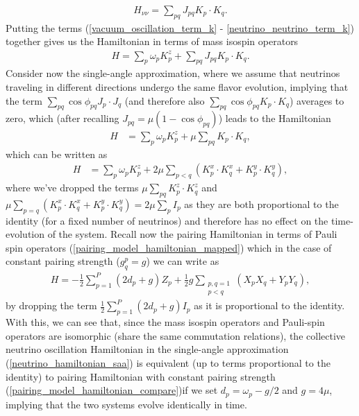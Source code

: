 \documentclass[Dual]{msu-thesis}
\begin{document}
\begin{align}
\label{neutrino_neutrino_term_k}
H_{\nu\nu}=\sum_{pq}J_{pq}K_p\cdot K_q
.\end{align}
Putting the terms (\ref{vacuum_oscillation_term_k} - \ref{neutrino_neutrino_term_k}) together gives us the Hamiltonian in terms of mass isospin operators
\begin{align}
H=\sum_p\omega_pK^z_p+\sum_{pq}J_{pq}K_p\cdot K_q
.\end{align}
Consider now the single-angle approximation, where we assume that neutrinos traveling in different directions undergo the same flavor evolution, implying that the term $\sum_{pq}\cos\phi_{pq}J_p\cdot J_q$ (and therefore also $\sum_{pq}\cos\phi_{pq}K_p\cdot K_q$) averages to zero, which (after recalling $J_{pq}=\mu(1-\cos\phi_{pq})$) leads to the Hamiltonian
\begin{align}
H
&=
\sum_p\omega_pK^z_p+\mu\sum_{pq}K_p\cdot K_q
,\end{align}
which can be written as
\begin{align}
\label{neutrino_hamiltonian_saa}
H
&=
\sum_p\omega_pK^z_p+2\mu\sum_{p<q}(K^x_p\cdot K^x_q+K^y_p\cdot K^y_q)
,\end{align}
where we've dropped the terms $\mu\sum_{pq}K^z_p\cdot K^z_q$ and $\mu\sum_{p=q}(K^x_p\cdot K^x_q+K^y_p\cdot K^y_q)=2\mu\sum_{p}I_p$ as they are both proportional to the identity (for a fixed number of neutrinos) and therefore has no effect on the time-evolution of the system. Recall now the pairing Hamiltonian in terms of Pauli spin operators (\ref{pairing_model_hamiltonian_mapped}) which in the case of constant pairing strength ($g^p_q=g$) we can write as 
\begin{align}
\label{pairing_model_hamiltonian_compare}
H
=
-\frac{1}{2}\sum_{p=1}^P(2d_p+g)Z_p
+
\frac{1}{2}g\sum_{\substack{p,q=1 \\ p<q}}(X_pX_q+Y_pY_q)
,\end{align}
by dropping the term $\frac{1}{2}\sum_{p=1}^P(2d_p+g)I_p$ as it is proportional to the identity. With this, we can see that, since the mass isospin operators and Pauli-spin operators are isomorphic (share the same commutation relations), the collective neutrino oscillation Hamiltonian in the single-angle approximation (\ref{neutrino_hamiltonian_saa}) is equivalent (up to terms proportional to the identity) to pairing Hamiltonian with constant pairing strength (\ref{pairing_model_hamiltonian_compare})if we set $d_p=\omega_p-g/2$ and $g=4\mu$, implying that the two systems evolve identically in time.
\end{document}

